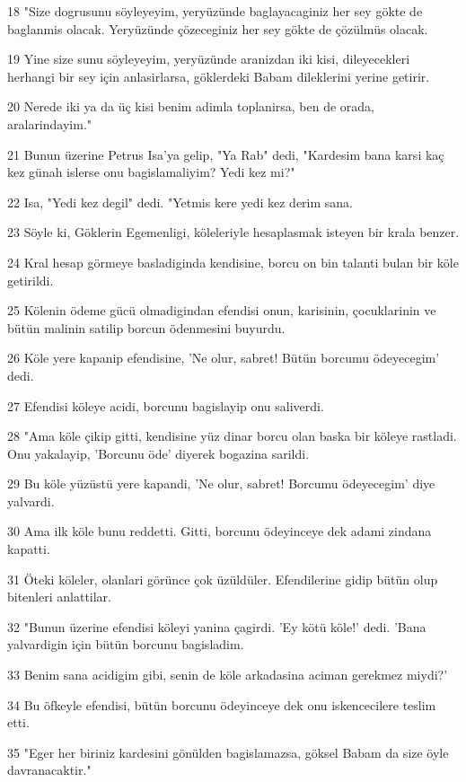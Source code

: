 \par 18 "Size dogrusunu söyleyeyim, yeryüzünde baglayacaginiz her sey gökte de baglanmis olacak. Yeryüzünde çözeceginiz her sey gökte de çözülmüs olacak.
\par 19 Yine size sunu söyleyeyim, yeryüzünde aranizdan iki kisi, dileyecekleri herhangi bir sey için anlasirlarsa, göklerdeki Babam dileklerini yerine getirir.
\par 20 Nerede iki ya da üç kisi benim adimla toplanirsa, ben de orada, aralarindayim."
\par 21 Bunun üzerine Petrus Isa'ya gelip, "Ya Rab" dedi, "Kardesim bana karsi kaç kez günah islerse onu bagislamaliyim? Yedi kez mi?"
\par 22 Isa, "Yedi kez degil" dedi. "Yetmis kere yedi kez derim sana.
\par 23 Söyle ki, Göklerin Egemenligi, köleleriyle hesaplasmak isteyen bir krala benzer.
\par 24 Kral hesap görmeye basladiginda kendisine, borcu on bin talanti bulan bir köle getirildi.
\par 25 Kölenin ödeme gücü olmadigindan efendisi onun, karisinin, çocuklarinin ve bütün malinin satilip borcun ödenmesini buyurdu.
\par 26 Köle yere kapanip efendisine, 'Ne olur, sabret! Bütün borcumu ödeyecegim' dedi.
\par 27 Efendisi köleye acidi, borcunu bagislayip onu saliverdi.
\par 28 "Ama köle çikip gitti, kendisine yüz dinar borcu olan baska bir köleye rastladi. Onu yakalayip, 'Borcunu öde' diyerek bogazina sarildi.
\par 29 Bu köle yüzüstü yere kapandi, 'Ne olur, sabret! Borcumu ödeyecegim' diye yalvardi.
\par 30 Ama ilk köle bunu reddetti. Gitti, borcunu ödeyinceye dek adami zindana kapatti.
\par 31 Öteki köleler, olanlari görünce çok üzüldüler. Efendilerine gidip bütün olup bitenleri anlattilar.
\par 32 "Bunun üzerine efendisi köleyi yanina çagirdi. 'Ey kötü köle!' dedi. 'Bana yalvardigin için bütün borcunu bagisladim.
\par 33 Benim sana acidigim gibi, senin de köle arkadasina aciman gerekmez miydi?'
\par 34 Bu öfkeyle efendisi, bütün borcunu ödeyinceye dek onu iskencecilere teslim etti.
\par 35 "Eger her biriniz kardesini gönülden bagislamazsa, göksel Babam da size öyle davranacaktir."

